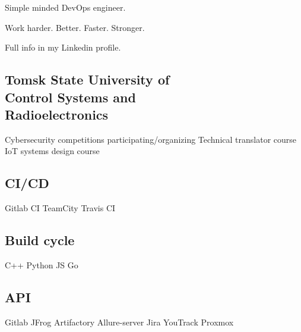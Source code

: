 \documentclass[a4paper]{MagicalCV}
\begin{document}
\lastupdated


\begin{minipage}[t]{0.33\textwidth} 


Simple minded DevOps engineer.

Work harder. Better. Faster. Stronger.

Full info in my Linkedin profile.
\sectionsep





\sectionsep


\subsection{Tomsk State University of \\ Control Systems and \\ Radioelectronics}
\vspace{\topsep} %
Cybersecurity competitions participating/organizing \textbullet{} Technical translator course \textbullet{} IoT systems design course
\sectionsep


\subsection{CI/CD}
Gitlab CI \textbullet{} 
TeamCity \textbullet{} 
Travis CI 
\subsection{Build cycle}
C++ \textbullet{} 
Python \textbullet{} 
JS \textbullet{} 
Go
\subsection{API}
Gitlab \textbullet{} 
JFrog Artifactory \textbullet{} 
Allure-server \textbullet{}
Jira \textbullet{} 
YouTrack \textbullet{} 
Proxmox

\end{minipage}
\end{document}
